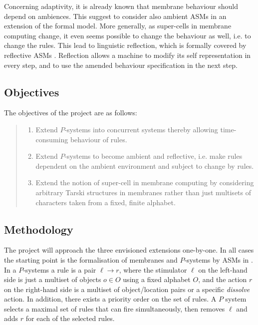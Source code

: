 \documentclass[11pt]{llncs}
\begin{document}
Concerning adaptivity, it is already known that membrane behaviour should depend on ambiences. This suggest to consider also ambient ASMs \cite{boerger:jcss2012} in an extension of the formal model. More generally, as super-cells in membrane computing change, it even seems possible to change the behaviour as well, i.e. to change the rules. This lead to linguistic reflection, which is formally covered by reflective ASMs \cite{schewe:synasc2017}. Reflection allows a machine to modify its self representation in every step, and to use the amended behaviour specification in the next step.

\subsection{Objectives}

The objectives of the project are as follows:

\begin{quote}
\begin{enumerate}\renewcommand{\labelenumi}{\textbf{O\arabic{enumi}.}}

\item Extend $P$-systems into concurrent systems thereby allowing time-consuming behaviour of rules.

\item Extend $P$-systems to become ambient and reflective, i.e. make rules dependent on the ambient environment and subject to change by rules.

\item Extend the notion of super-cell in membrane computing by considering arbitrary Tarski structures in membranes rather than just multisets of characters taken from a fixed, finite alphabet.

\end{enumerate}
\end{quote}

\subsection{Methodology}

The project will approach the three envisioned extensions one-by-one. In all cases the starting point is the formalisation of membranes and $P$-systems by ASMs in \cite{schewe:abz2018}. In a $P$-systems a rule is a pair $\ell \rightarrow r$, where the stimulator $\ell$ on the left-hand side is just a multiset of objects $o \in O$ using a fixed alphabet $O$, and the action $r$ on the right-hand side is a multiset of object/location pairs or a specific {\em dissolve} action. In addition, there exists a priority order on the set of rules. A $P$ system selects a maximal set of rules that can fire simultaneously, then removes $\ell$ and adds $r$ for each of the selected rules. 
\end{document}
